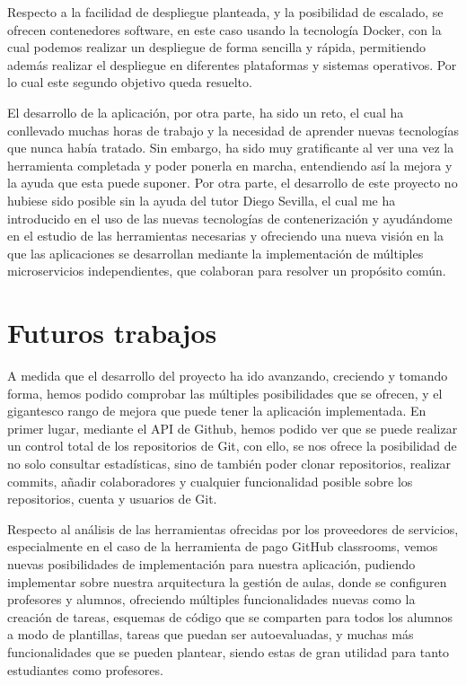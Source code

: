 Respecto a la facilidad de despliegue planteada, y la posibilidad de
escalado, se ofrecen contenedores software, en este caso usando la
tecnología Docker, con la cual podemos realizar un despliegue de forma
sencilla y rápida, permitiendo además realizar el despliegue en diferentes
plataformas y sistemas operativos. Por lo cual este segundo objetivo queda
resuelto.

El desarrollo de la aplicación, por otra parte, ha sido un reto, el cual ha
conllevado muchas horas de trabajo y la necesidad de aprender nuevas
tecnologías que nunca había tratado. Sin embargo, ha sido muy gratificante
al ver una vez la herramienta completada y poder ponerla en marcha,
entendiendo así la mejora y la ayuda que esta puede suponer. Por otra
parte, el desarrollo de este proyecto no hubiese sido posible sin la ayuda
del tutor Diego Sevilla, el cual me ha introducido en el uso de las nuevas
tecnologías de contenerización y ayudándome en el estudio de las
herramientas necesarias y ofreciendo una nueva visión en la que las
aplicaciones se desarrollan mediante la implementación de múltiples
microservicios independientes, que colaboran para resolver un propósito
común.


\section{Futuros trabajos}

A medida que el desarrollo del proyecto ha ido avanzando, creciendo y
tomando forma, hemos podido comprobar las múltiples posibilidades que se
ofrecen, y el gigantesco rango de mejora que puede tener la aplicación
implementada. En primer lugar, mediante el API de Github, hemos podido ver
que se puede realizar un control total de los repositorios de Git, con
ello, se nos ofrece la posibilidad de no solo consultar estadísticas, sino
de también poder clonar repositorios, realizar commits, añadir
colaboradores y cualquier funcionalidad posible sobre los repositorios,
cuenta y usuarios de Git.

Respecto al análisis de las herramientas ofrecidas por los proveedores de
servicios, especialmente en el caso de la herramienta de pago GitHub
classrooms, vemos nuevas posibilidades de implementación para nuestra
aplicación, pudiendo implementar sobre nuestra arquitectura la gestión de
aulas, donde se configuren profesores y alumnos, ofreciendo múltiples
funcionalidades nuevas como la creación de tareas, esquemas de código que
se comparten para todos los alumnos a modo de plantillas, tareas que puedan
ser autoevaluadas, y muchas más funcionalidades que se pueden plantear,
siendo estas de gran utilidad para tanto estudiantes como profesores.

